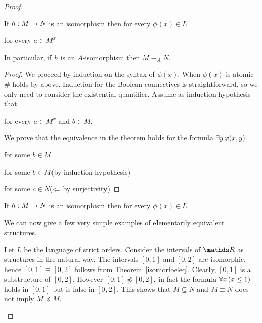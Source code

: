 \begin{proof}
\begin{theorem}\label{isomorfoeleq}
If $h:M\rightarrow N$ is an isomorphism then for every $\phi(x)\in L$

 for every $a\in M^x$

In particular, if $h$ is an $A$-isomorphism then $M\equiv_A N$.
\end{theorem}

\begin{proof}
  We proceed by induction on the syntax of $\phi(x)$.
  When $\phi(x)$ is atomic \# holds by  above.
  Induction for the Boolean connectives is straightforward, so we only need to consider the existential quantifier.
  Assume as induction hypothesis that


   for every $a\in M^x$ and $b\in M$.

We prove that the equivalence in the theorem holds for the formula $\exists y\,\varphi(x,y)$.

 for some $b\in M$

 for some $b\in M$\hfill (by induction hypothesis)

for some $c\in N$\hfill ($\Leftarrow$ by surjectivity)

\end{proof}


\begin{corollary}\label{corol_def_set_invariant}
If $h:M\rightarrow N$ is an isomorphism then for every $\phi(x)\in L$.

\end{corollary}

We can now give a few very simple examples of elementarily equivalent structures.

\begin{example}\label{expl_ordini_elem}
Let $L$ be the language of strict orders.
Consider the intervals of $\RR$ as structures in the natural way.
The intervals $[0,1]$ and $[0,2]$ are isomorphic, hence $[0,1]\equiv[0,2]$ follows from Theorem~\ref{isomorfoeleq}.
Clearly, $[0,1]$ is a substructure of $[0,2]$.
However $[0,1]\npreceq [0,2]$, in fact the formula $\forall  x\,(x\le1)$ holds in $[0,1]$ but is false in $[0,2]$.
This shows that $M\subseteq N$ and $M\equiv N$ does not imply $M\preceq M$.


\end{example}
\end{proof}
